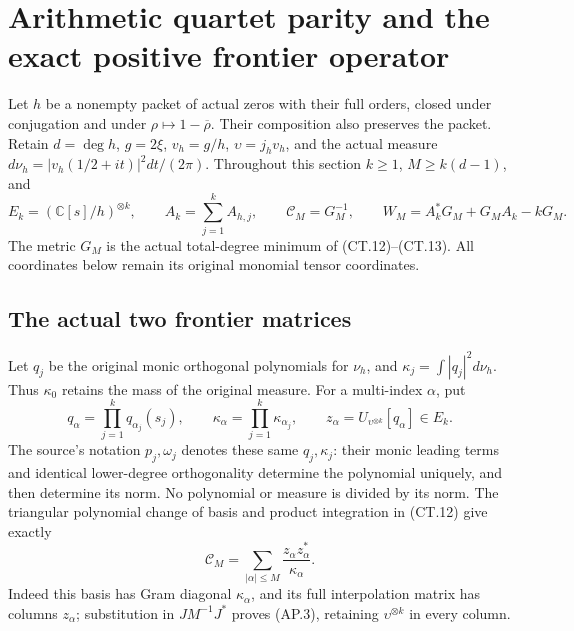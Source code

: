 \section{Arithmetic quartet parity and the exact positive frontier operator}
\label{sec:arithmetic-frontier-parity}

Let \(h\) be a nonempty packet of actual zeros with their full
orders, closed under conjugation and under
\(\rho\mapsto1-\overline\rho\).  Their composition also
preserves the packet.  Retain \(d=\deg h\), \(g=2\xi\),
\(v_h=g/h\), \(\upsilon=j_hv_h\), and the actual measure
\(d\nu_h=|v_h(1/2+it)|^2dt/(2\pi)\).  Throughout this section
\(k\ge1\), \(M\ge k(d-1)\), and
\[
 E_k=(\mathbb C[s]/h)^{\otimes k},\qquad
 A_k=\sum_{j=1}^k A_{h,j},\qquad
 \mathcal C_M=G_M^{-1},\qquad
 W_M=A_k^*G_M+G_MA_k-kG_M.
 \tag{AP.1}
\]
The metric \(G_M\) is the actual total-degree minimum of
(CT.12)--(CT.13).  All coordinates below remain its original
monomial tensor coordinates.

\subsection{The actual two frontier matrices}

Let \(q_j\) be the original monic orthogonal polynomials for
\(\nu_h\), and \(\kappa_j=\int|q_j|^2d\nu_h\).
Thus \(\kappa_0\) retains the mass of the original measure.
For a multi-index \(\alpha\), put
\[
 q_\alpha=\prod_{j=1}^kq_{\alpha_j}(s_j),\qquad
 \kappa_\alpha=\prod_{j=1}^k\kappa_{\alpha_j},\qquad
 z_\alpha=U_{\upsilon^{\otimes k}}[q_\alpha]\in E_k.
 \tag{AP.2}
\]
The source's notation \(p_j,\omega_j\) denotes these same
\(q_j,\kappa_j\): their monic leading terms and identical
lower-degree orthogonality determine the polynomial uniquely,
and then determine its norm.  No polynomial or measure is divided
by its norm.  The triangular polynomial change of basis and product
integration in (CT.12) give exactly
\[
 \mathcal C_M=\sum_{|\alpha|\le M}
                       \frac{z_\alpha z_\alpha^*}{\kappa_\alpha}.
 \tag{AP.3}
\]
Indeed this basis has Gram diagonal \(\kappa_\alpha\),
and its full interpolation matrix has columns \(z_\alpha\);
substitution in \(JM^{-1}J^*\) proves (AP.3), retaining
\(\upsilon^{\otimes k}\) in every column.

